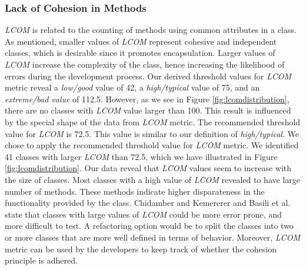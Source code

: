 \subsubsection{Lack of Cohesion in Methods}


\textit{LCOM} is related to the counting of methods using common attributes in a class. As mentioned, smaller values of \textit{LCOM} represent cohesive and independent classes, which is desirable since it promotes encapsulation. Larger values of \textit{LCOM} increase the complexity of the class, hence increasing the likelihood of errors during the development process. Our derived threshold values for \textit{LCOM} metric reveal a \textit{low/good} value of 42, a \textit{high/typical} value of 75, and an \textit{extreme/bad value} of 112.5. However, as we see in Figure \ref{fig:lcomdistribution}, there are no classes with \textit{LCOM} value larger than 100. This result is influenced by the special shape of the data from \textit{LCOM} metric. The recommended threshold value for \textit{LCOM} is 72.5. This value is similar to our definition of \textit{high/typical}. We chose to apply the recommended threshold value for \textit{LCOM} metric. We identified 41 classes with larger \textit{LCOM} than 72.5, which we have illustrated in Figure \ref{fig:lcomdistribution}. Our data reveal that \textit{LCOM} values seem to increase with the size of classes. Most classes with a high value of \textit{LCOM} revealed to have large number of methods. These methods indicate higher disparateness in the functionality provided by the class. Chidamber and Kemererer\cite{chidamber1994metrics} and Basili et al.\cite{basili1996validation} state that classes with large values of \textit{LCOM} could be more error prone, and more difficult to test. A refactoring option would be to split the classes into two or more classes that are more well defined in terms of behavior. Moreover, \textit{LCOM} metric can be used by the developers to keep track of whether the cohesion principle is adhered.





